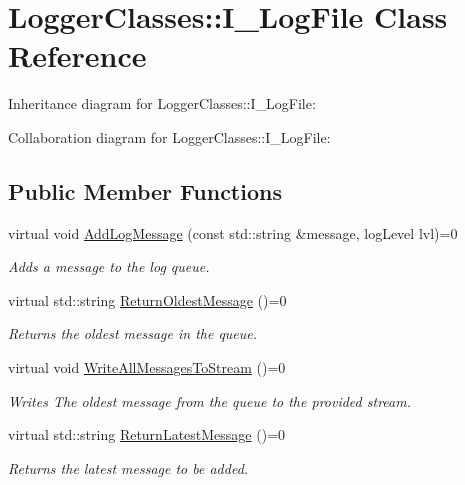 \hypertarget{classLoggerClasses_1_1I__LogFile}{}\section{Logger\+Classes\+::I\+\_\+\+Log\+File Class Reference}
\label{classLoggerClasses_1_1I__LogFile}


Inheritance diagram for Logger\+Classes\+::I\+\_\+\+Log\+File\+:


Collaboration diagram for Logger\+Classes\+::I\+\_\+\+Log\+File\+:
\subsection*{Public Member Functions}
\begin{DoxyCompactItemize}
\item 
\mbox{\label{classLoggerClasses_1_1I__LogFile_af928354dfce0f9ad54730faee0f5dbab}} 
virtual void \mbox{\hyperlink{classLoggerClasses_1_1I__LogFile_af928354dfce0f9ad54730faee0f5dbab}{Add\+Log\+Message}} (const std\+::string \&message, log\+Level lvl)=0
\begin{DoxyCompactList}\small\item\em Adds a message to the log queue. \end{DoxyCompactList}\item 
\mbox{\label{classLoggerClasses_1_1I__LogFile_abe417f462ced8b890878233d7c2a860e}} 
virtual std\+::string \mbox{\hyperlink{classLoggerClasses_1_1I__LogFile_abe417f462ced8b890878233d7c2a860e}{Return\+Oldest\+Message}} ()=0
\begin{DoxyCompactList}\small\item\em Returns the oldest message in the queue. \end{DoxyCompactList}\item 
\mbox{\label{classLoggerClasses_1_1I__LogFile_a91d67fd8de7bffe69bec95bcb56e7fc4}} 
virtual void \mbox{\hyperlink{classLoggerClasses_1_1I__LogFile_a91d67fd8de7bffe69bec95bcb56e7fc4}{Write\+All\+Messages\+To\+Stream}} ()=0
\begin{DoxyCompactList}\small\item\em Writes The oldest message from the queue to the provided stream. \end{DoxyCompactList}\item 
\mbox{\label{classLoggerClasses_1_1I__LogFile_a45f85ac4d59df0b7a96f0282cff1ba87}} 
virtual std\+::string \mbox{\hyperlink{classLoggerClasses_1_1I__LogFile_a45f85ac4d59df0b7a96f0282cff1ba87}{Return\+Latest\+Message}} ()=0
\begin{DoxyCompactList}\small\item\em Returns the latest message to be added. \end{DoxyCompactList}\end{DoxyCompactItemize}



